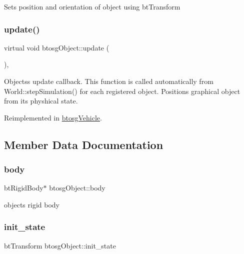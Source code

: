 Sets position and orientation of object using bt\+Transform \mbox{\label{classbtosgObject_a342917817dfde62554f83da8e0d5110b}} 
\subsubsection{\texorpdfstring{update()}{update()}}
{\footnotesize\ttfamily virtual void btosg\+Object\+::update (\begin{DoxyParamCaption}{ }\end{DoxyParamCaption})\hspace{0.3cm}{\ttfamily [inline]}, {\ttfamily [virtual]}}

Objects\textquotesingle{}s update callback. This function is called automatically from World\+::step\+Simulation() for each registered object. Positions graphical object from its physhical state. 

Reimplemented in \mbox{\hyperlink{classbtosgVehicle_a5fd0f471df492ac232c9b772a28bd2b9}{btosg\+Vehicle}}.



\subsection{Member Data Documentation}
\mbox{\label{classbtosgObject_a64ccde0543c184ed1749fdb9c9699785}} 
\subsubsection{\texorpdfstring{body}{body}}
{\footnotesize\ttfamily bt\+Rigid\+Body$\ast$ btosg\+Object\+::body}



object\textquotesingle{}s rigid body 

\mbox{\label{classbtosgObject_a2dee023f311114e200df9b04c8c1b400}} 
\subsubsection{\texorpdfstring{init\_state}{init\_state}}
{\footnotesize\ttfamily bt\+Transform btosg\+Object\+::init\+\_\+state}



